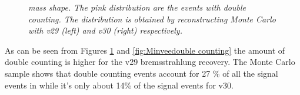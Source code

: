 \begin{figure}[ht]
\vspace*{-0.5cm}
  \begin{center}
  \vspace*{-1.0cm}
  \end{center}
  \caption{\textit{\Bd mass shape. The pink distribution are the events with double counting. The \Bd distribution is obtained by reconstructing \lhcb Monte Carlo with \davinci v29 (left) and \davinci v30 (right) respectively.}}
  \label{fig:oldBremAddernodcc}
\end{figure}
As can be seen from Figures \ref{fig:oldBremAddernodcc} and \ref{fig:Minveedouble counting} the amount of double counting is higher for the \davinci v29 bremsstrahlung recovery. The \lhcb Monte Carlo sample shows that double counting events account for 27 \% of all the signal events in  while it's only about 14\% of the signal events for \davinci v30. \\



